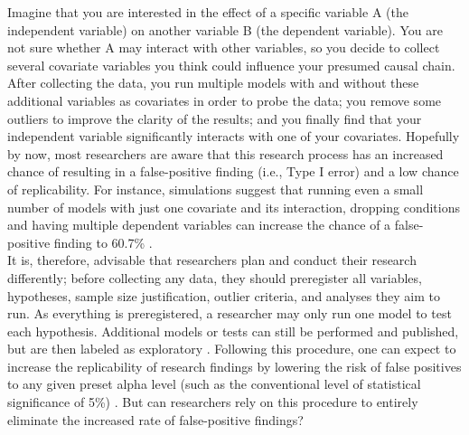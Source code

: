 Imagine that you are interested in the effect of a specific variable A (the independent variable) on another variable B (the dependent variable). You are not sure whether A may interact with other variables, so you decide to collect several covariate variables you think could influence your presumed causal chain. After collecting the data, you run multiple models with and without these additional variables as covariates in order to probe the data; you remove some outliers to improve the clarity of the results; and you finally find that your independent variable significantly interacts with one of your covariates. Hopefully by now, most researchers are aware that this research process has an increased chance of resulting in a false-positive finding (i.e., Type I error) and a low chance of replicability. For instance, simulations suggest that running even a small number of models with just one covariate and its interaction, dropping conditions and having multiple dependent variables can increase the chance of a false-positive finding to 60.7\% \citep{Simmons2011}.\\

It is, therefore, advisable that researchers plan and conduct their research differently; before collecting any data, they should preregister all variables, hypotheses, sample size justification, outlier criteria, and analyses they aim to run. As everything is preregistered, a researcher may only run one model to test each hypothesis. Additional models or tests can still be performed and published, but are then labeled as exploratory \citep{Nosek2018}. Following this procedure, one can expect to increase the replicability of research findings by lowering the risk of false positives to any given preset alpha level (such as the conventional level of statistical significance of 5\%) \citep{Moore2016}. But can researchers rely on this procedure to entirely eliminate the increased rate of false-positive findings? \\

